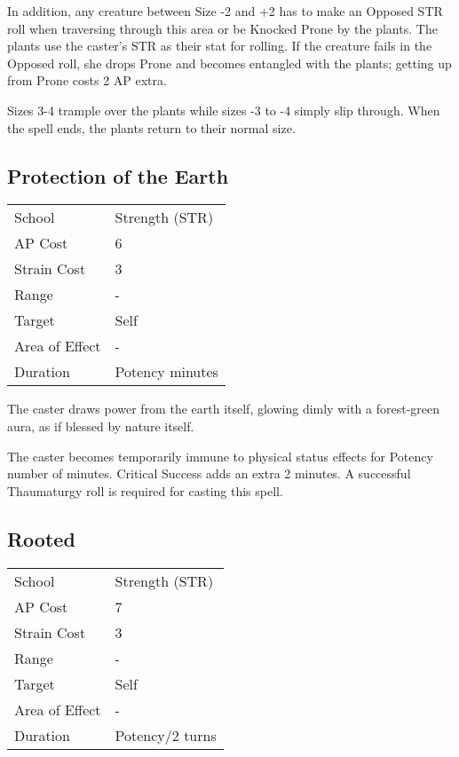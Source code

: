 \documentclass[11pt,a4paper,twocolumn]{book}
\begin{document}
In addition, any creature between Size -2 and +2 has to make an Opposed STR roll when traversing through this area or be Knocked Prone by the plants. The plants use the caster's STR as their stat for rolling. If the creature fails in the Opposed roll, she drops Prone and becomes entangled with the plants; getting up from Prone costs 2 AP extra. 

Sizes 3-4 trample over the plants while sizes -3 to -4 simply slip through. When the spell ends, the plants return to their normal size.

\vfill

\subsection*{Protection of the Earth}
{
	\begin{tabu} to 75mm{| X[l,4] | X[l,7] |}
		\hline
		School 			& Strength (STR) 	\\
		AP Cost	      	& 6 				\\
		Strain Cost     & 3 				\\
		Range     		& - 				\\
		Target      	& Self 				\\
		Area of Effect  & - 	 			\\
		Duration     	& Potency minutes 	\\ \hline
	\end{tabu}
	
}

\medskip

The caster draws power from the earth itself, glowing dimly with a forest-green aura, as if blessed by nature itself.

The caster becomes temporarily immune to physical status effects for Potency number of minutes. Critical Success adds an extra 2 minutes. A successful Thaumaturgy roll is required for casting this spell.


\subsection*{Rooted}
{
	\begin{tabu} to 75mm{| X[l,4] | X[l,7] |}
		\hline
		School 			& Strength (STR) 	\\
		AP Cost	      	& 7 				\\
		Strain Cost     & 3 				\\
		Range     		& - 				\\
		Target      	& Self 				\\
		Area of Effect  & - 	 			\\
		Duration     	& Potency/2 turns 	\\ \hline
	\end{tabu}
	
}
\end{document}
